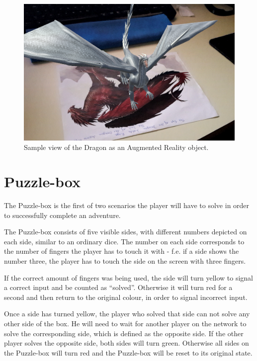 \documentclass{sigchi-ext}
\begin{document}
\begin{figure}
	\centering
	\includegraphics[width=1\columnwidth]{figures/PM_AR_Dragon}
	\caption{Sample view of the Dragon as an Augmented Reality object.}\label{fig:AR_Dragon1}
\end{figure}

\section{Puzzle-box}

The Puzzle-box is the first of two scenarios the player will have to solve in order to successfully complete an adventure.

The Puzzle-box consists of five visible sides, with different numbers depicted on each side, similar to an ordinary dice. The number on each side corresponds to the number of fingers the player has to touch it with - f.e. if a side shows the number three, the player has to touch the side on the screen with three fingers.

If the correct amount of fingers was being used, the side will turn yellow to signal a correct input and be counted as ``solved''. Otherwise it will turn red for a second and then return to the original colour, in order to signal incorrect input.

Once a side has turned yellow, the player who solved that side can not solve any other side of the box. He will need to wait for another player on the network to solve the corresponding side, which is defined as the opposite side. If the other player solves the opposite side, both sides will turn green. Otherwise all sides on the Puzzle-box will turn red and the Puzzle-box will be reset to its original state.
\end{document}
